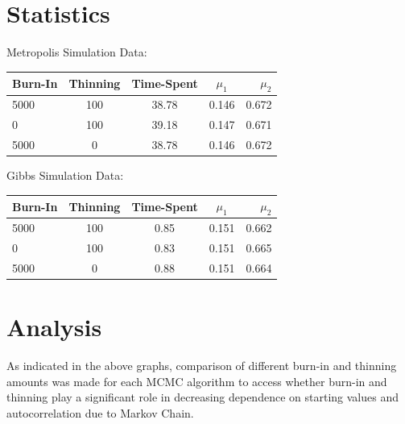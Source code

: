 \documentclass[11pt,a4paper]{article}
\begin{document}

\section*{Statistics}

\begin{center}
Metropolis Simulation Data: \\ 
  \begin{tabular}{ | l | c | c | c | r | }
    \hline
    Burn-In & Thinning & Time-Spent & $\mu_{1}$ & $\mu_{2}$ \\ \hline
    5000 & 100 & 38.78 & 0.146 & 0.672 \\ \hline
    0 & 100 & 39.18 & 0.147 & 0.671 \\ \hline
    5000 & 0 & 38.78 & 0.146 & 0.672 \\ 
    \hline
  \end{tabular}
\end{center}

\begin{center}
Gibbs Simulation Data: \\
  \begin{tabular}{ | l | c | c | c | r | }
    \hline
    Burn-In & Thinning & Time-Spent & $\mu_{1}$ & $\mu_{2}$ \\ \hline
    5000 & 100 & 0.85 & 0.151 & 0.662 \\ \hline
    0 & 100 & 0.83 & 0.151 & 0.665\\ \hline
    5000 & 0 & 0.88 & 0.151 & 0.664 \\ 
    \hline
  \end{tabular}
\end{center}



\newpage


\section*{Analysis}
As indicated in the above graphs, comparison of different burn-in and thinning amounts was made for each MCMC algorithm to access whether burn-in and thinning play a significant role in decreasing dependence on starting values and autocorrelation due to Markov Chain. \\ 
\end{document}
